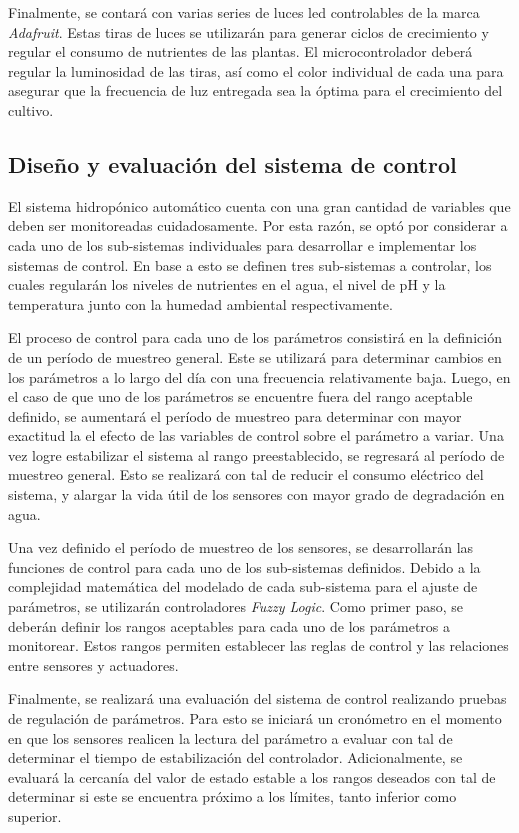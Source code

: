 Finalmente, se contará con varias series de luces led controlables de la marca \textit{Adafruit}. Estas tiras de luces se utilizarán para generar ciclos de crecimiento y regular el consumo de nutrientes de las plantas. El microcontrolador deberá regular la luminosidad de las tiras, así como el color individual de cada una para asegurar que la frecuencia de luz entregada sea la óptima para el crecimiento del cultivo.

\subsection*{Diseño y evaluación del sistema de control}
El sistema hidropónico automático cuenta con una gran cantidad de variables que deben ser monitoreadas cuidadosamente. Por esta razón, se optó por considerar a cada uno de los sub-sistemas individuales para desarrollar e implementar los sistemas de control. En base a esto se definen tres sub-sistemas a controlar, los cuales regularán los niveles de nutrientes en el agua, el nivel de pH y la temperatura junto con la humedad ambiental respectivamente.

El proceso de control para cada uno de los parámetros consistirá en la definición de un período de muestreo general. Este se utilizará para determinar cambios en los parámetros a lo largo del día con una frecuencia relativamente baja. Luego, en el caso de que uno de los parámetros se encuentre fuera del rango aceptable definido, se aumentará el período de muestreo para determinar con mayor exactitud la el efecto de las variables de control sobre el parámetro a variar. Una vez logre estabilizar el sistema al rango preestablecido, se regresará al período de muestreo general. Esto se realizará con tal de reducir el consumo eléctrico del sistema, y alargar la vida útil de los sensores con mayor grado de degradación en agua. 

Una vez definido el período de muestreo de los sensores, se desarrollarán las funciones de control para cada uno de los sub-sistemas definidos. Debido a la complejidad matemática del modelado de cada sub-sistema para el ajuste de parámetros, se utilizarán controladores \textit{Fuzzy Logic}. Como primer paso, se deberán definir los rangos aceptables para cada uno de los parámetros a monitorear. Estos rangos permiten establecer las reglas de control y las relaciones entre sensores y actuadores. 

Finalmente, se realizará una evaluación del sistema de control realizando pruebas de regulación de parámetros. Para esto se iniciará un cronómetro en el momento en que los sensores realicen la lectura del parámetro a evaluar con tal de determinar el tiempo de estabilización del controlador. Adicionalmente, se evaluará la cercanía del valor de estado estable a los rangos deseados con tal de determinar si este se encuentra próximo a los límites, tanto inferior como superior.

